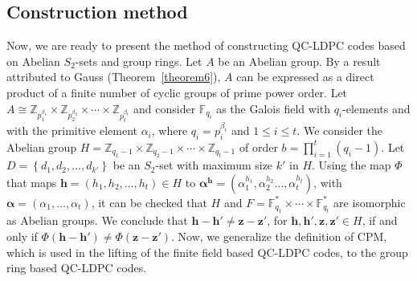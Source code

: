 \documentclass[journal,draftclsnofoot,onecolumn,12pt,twoside]{IEEEtran}
\begin{document}
\subsection{Construction method}
Now, we are ready to present the method of constructing QC-LDPC codes based on Abelian $S_2$-sets and group rings.
Let $A$ be an Abelian group. By a result attributed to Gauss (Theorem~\ref{theorem6}),  $A$ can be expressed as a direct product of a finite number of cyclic groups of prime power order. Let $A \cong \mathbb{Z}_{p_1^{\beta_1}}\times \mathbb{Z}_{p_2^{\beta_2}}\times \cdots \times \mathbb{Z}_{p_t^{\beta_t}}$ and consider $\mathbb{F}_{q_i}$  as the Galois field with $q_i$-elements and with the primitive element $\alpha_i$, where $q_i=p_i^{\beta_i}$ and $1\leq i\leq t$. We consider the Abelian group $H= \mathbb{Z}_{q_1-1}\times \mathbb{Z}_{q_2-1}\times \cdots \times \mathbb{Z}_{q_t-1}$ of order $b=\prod_{i=1}^t (q_i-1)$. Let $D=\left\lbrace d_1,d_2,\ldots ,d_{k'} \right\rbrace$ be an $S_2$-set with maximum size $k'$ in $H$. Using the map $\Phi$ that maps $\mathbf{h}=(h_1,h_2,\ldots ,h_t)\in H$ to $\boldsymbol{\alpha}^{\mathbf{h}}=(\alpha_1^{h_1},\alpha_2^{h_2}\ldots, \alpha_t^{h_t})$, with $\boldsymbol{\alpha}=(\alpha_1,\ldots,\alpha_t)$, it can be checked that $H$ and $F=\mathbb{F}_{q_1}^*\times \cdots \times \mathbb{F}_{q_t}^*$ are isomorphic as Abelian groups.
We conclude that $\mathbf{h}-\mathbf{h}'\neq \mathbf{z}-\mathbf{z}'$, for $\mathbf{h},\mathbf{h}',\mathbf{z},\mathbf{z}'\in H$,  if and only if $\Phi(\mathbf{h}-\mathbf{h}')\neq \Phi(\mathbf{z}-\mathbf{z}')$. Now, we  generalize the definition of CPM, which is used in the lifting of the finite field based QC-LDPC codes, to the group ring based QC-LDPC codes.
\end{document}
